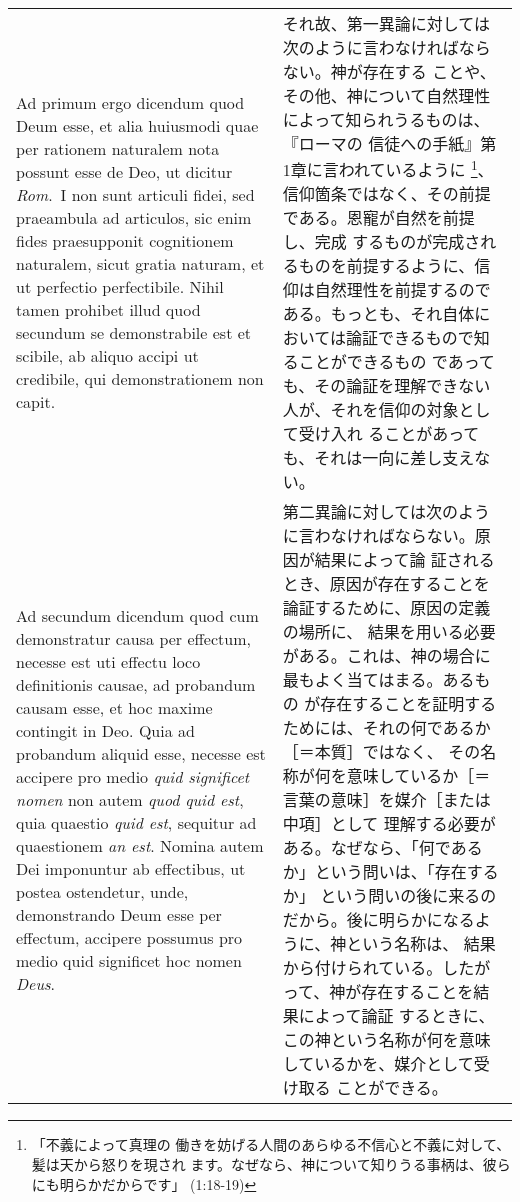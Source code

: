 \documentclass[10pt]{jsarticle}
\begin{document}
\begin{longtable}{p{21em}p{21em}}
\\



{\sc Ad primum ergo dicendum} quod Deum esse, et alia huiusmodi quae
per rationem naturalem nota possunt esse de Deo, ut dicitur {\it
Rom}.~I non sunt articuli fidei, sed praeambula ad articulos, sic enim
fides praesupponit cognitionem naturalem, sicut gratia naturam, et ut
perfectio perfectibile. Nihil tamen prohibet illud quod secundum se
demonstrabile est et scibile, ab aliquo accipi ut credibile, qui
demonstrationem non capit.

& 


それ故、第一異論に対しては次のように言わなければならない。神が存在する
ことや、その他、神について自然理性によって知られうるものは、『ローマの
信徒への手紙』第1章に言われているように \footnote{「不義によって真理の
働きを妨げる人間のあらゆる不信心と不義に対して、髪は天から怒りを現され
ます。なぜなら、神について知りうる事柄は、彼らにも明らかだからです」
(1:18-19)}、信仰箇条ではなく、その前提である。恩寵が自然を前提し、完成
するものが完成されるものを前提するように、信仰は自然理性を前提するので
ある。もっとも、それ自体においては論証できるもので知ることができるもの
であっても、その論証を理解できない人が、それを信仰の対象として受け入れ
ることがあっても、それは一向に差し支えない。

\\



{\sc Ad secundum dicendum} quod cum demonstratur causa per effectum,
necesse est uti effectu loco definitionis causae, ad probandum causam
esse, et hoc maxime contingit in Deo. Quia ad probandum aliquid esse,
necesse est accipere pro medio {\it quid significet nomen} non autem
{\it quod quid est}, quia quaestio {\it quid est}, sequitur ad
quaestionem {\it an est}. Nomina autem Dei imponuntur ab effectibus,
ut postea ostendetur, unde, demonstrando Deum esse per effectum,
accipere possumus pro medio quid significet hoc nomen {\it Deus}.

&

第二異論に対しては次のように言わなければならない。原因が結果によって論
証されるとき、原因が存在することを論証するために、原因の定義の場所に、
結果を用いる必要がある。これは、神の場合に最もよく当てはまる。あるもの
が存在することを証明するためには、それの何であるか［＝本質］ではなく、
その名称が何を意味しているか［＝言葉の意味］を媒介［または中項］として
理解する必要がある。なぜなら、「何であるか」という問いは、「存在するか」
という問いの後に来るのだから。後に明らかになるように、神という名称は、
結果から付けられている。したがって、神が存在することを結果によって論証
するときに、この神という名称が何を意味しているかを、媒介として受け取る
ことができる。


\end{longtable}
\end{document}
